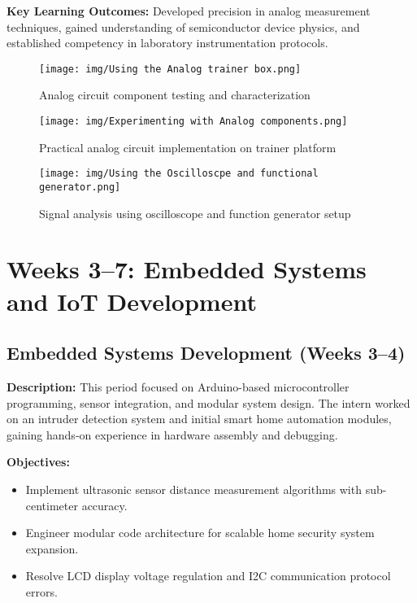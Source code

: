 \documentclass[12pt,a4paper]{report}
\begin{document}
\noindent\textbf{Key Learning Outcomes:} Developed precision in analog measurement techniques, gained understanding of semiconductor device physics, and established competency in laboratory instrumentation protocols.

\begin{figure}[H]
\centering
\begin{minipage}[t]{0.49\textwidth}
  \centering
  \texttt{[image: img/Using the Analog trainer box.png]}
  \caption{Analog circuit component testing and characterization}
  \label{fig:analog-components}
\end{minipage}
\hfill
\begin{minipage}[t]{0.49\textwidth}
  \centering
  \texttt{[image: img/Experimenting with Analog components.png]}
  \caption{Practical analog circuit implementation on trainer platform}
  \label{fig:analog-trainer}
\end{minipage}

\vspace{4em}

\begin{minipage}[t]{0.98\textwidth}
  \centering
  \texttt{[image: img/Using the Oscilloscpe and functional generator.png]}
  \caption{Signal analysis using oscilloscope and function generator setup}
  \label{fig:oscilloscope-setup}
\end{minipage}
\end{figure}

\section{Weeks 3--7: Embedded Systems and IoT Development}

\subsection{Embedded Systems Development (Weeks 3--4)}

\noindent\textbf{Description:} This period focused on Arduino-based microcontroller programming, sensor integration, and modular system design. The intern worked on an intruder detection system and initial smart home automation modules, gaining hands-on experience in hardware assembly and debugging.

\noindent\textbf{Objectives:}
\begin{itemize}
    \item Implement ultrasonic sensor distance measurement algorithms with sub-centimeter accuracy.
    \item Engineer modular code architecture for scalable home security system expansion.
    \item Resolve LCD display voltage regulation and I2C communication protocol errors.
\end{itemize}
\end{document}
